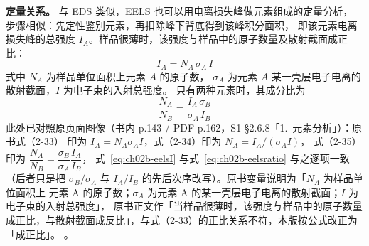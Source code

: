 \begin{principle}
\textbf{定量关系。} 与 EDS 类似，EELS 也可以用电离损失峰做元素组成的定量分析，
步骤相似：先定性鉴别元素，再扣除峰下背底得到该峰积分面积，
即该元素电离损失峰的总强度 $I_A$。样品很薄时，该强度与样品中的原子数量及散射截面成正比：
\begin{equation}
I_A=N_A\,\sigma_A\,I
\label{eq:ch02b-eelsI}
\end{equation}
式中 $N_A$ 为样品单位面积上元素 $A$ 的原子数，
$\sigma_A$ 为元素 $A$ 某一壳层电子电离的散射截面，$I$ 为电子束的入射总强度。
只有两种元素时，其成分比为
\begin{equation}
\frac{N_A}{N_B}=\frac{I_A\,\sigma_B}{\sigma_A\,I_B}
\label{eq:ch02b-eelsratio}
\end{equation}
此处已对照原页面图像（书内 p.143 / PDF p.162，S1 \S 2.6.8「1.~元素分析」）：原书式（2-33）
印为 $I_{A}=N_{A}\sigma_{A}I$，式（2-34）印为 $N_{A}=I_{A}/\left(\sigma_{A}I\right)$，
式（2-35）印为 $\dfrac{N_{A}}{N_{B}}=\dfrac{\sigma_{B}}{\sigma_{A}}\dfrac{I_{A}}{I_{B}}$，
式~\eqref{eq:ch02b-eelsI} 与式~\eqref{eq:ch02b-eelsratio} 与之逐项一致（后者只是把
$\sigma_{B}/\sigma_{A}$ 与 $I_{A}/I_{B}$ 的先后次序改写）。原书变量说明为「$N_{A}$ 为样品单位面积上
元素 A 的原子数；$\sigma_{A}$ 为元素 A 的某一壳层电子电离的散射截面；$I$ 为电子束的入射总强度」，
原书正文作「当样品很薄时，该强度与样品中的原子数量成正比，与散射截面成反比」，与式（2-33）的正比关系不符，本版按公式改正为「成正比」。
。
\end{principle}

